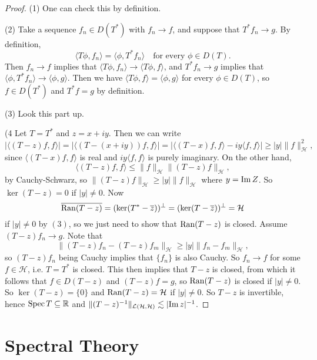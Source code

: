 \begin{proof}
  (1) One can check this by definition.

  (2) Take a sequence $f_n \in D(T^*)$ with
  $f_n \to f$, and suppose that $T^* f_n \to g$. By
  definition,
  \[
    \langle T \phi, f_n \rangle
    = \langle \phi, T^* f_n \rangle
    \quad \text{for every $\phi \in D(T)$}.
  \]
  Then $f_n \to f$ implies that
  $\langle T \phi, f_n \rangle \to \langle T \phi, f \rangle$,
  and $T^* f_n \to g$ implies that $\langle \phi, T^* f_n \rangle \to \langle \phi, g \rangle$.
  Then we have
  $\langle T \phi, f \rangle = \langle \phi, g \rangle$
  for every $\phi \in D(T)$, so
  $f \in D(T^*)$ and $T^* f = g$ by definition.

  (3) Look this part up.

  (4 Let $T = T^*$ and $z = x + iy$. Then we can write
  \[
    |\langle (T - z) f, f \rangle|
    = |\langle (T - (x + iy)) f, f \rangle|
    = |\langle (T - x) f, f \rangle
    - iy \langle f, f \rangle|
    \ge |y| \|f\|_{\mathcal{H}}^2,
  \]
  since $\langle (T - x) f, f \rangle$ is real and
  $iy \langle f, f \rangle$ is purely imaginary. On the
  other hand,
  \[
    \langle (T - z) f, f \rangle
    \le \|f\|_{\mathcal{H}} \|(T - z) f\|_{\mathcal{H}},
  \]
  by Cauchy-Schwarz, so $\|(T - z) f\|_{\mathcal{H}} \ge |y| \|f\|_{\mathcal{H}}$
  where $y = \operatorname{Im} Z$. So $\ker(T - z) = 0$ if $|y| \ne 0$.
  Now
  \[
    \overline{\operatorname{Ran}(T - z)} = (\ker (T^* - \overline{z}))^\perp
    = (\ker (T - \overline{z}))^\perp
    = \mathcal{H}
  \]
  if $|y| \ne 0$ by $(3)$, so we just need to show that
  $\operatorname{Ran}(T - z)$ is closed. Assume $(T - z) f_n \to g$.
  Note that
  \[
    \|(T - z) f_n - (T - z) f_m\|_{\mathcal{H}}
    \ge |y| \|f_n - f_m \|_{\mathcal{H}},
  \]
  so $(T - z) f_n$  being Cauchy implies that
  $\{f_n\}$ is also Cauchy. So $f_n \to f$ for some
  $f \in \mathcal{H}$, i.e. $T = T^*$ is closed.
  This then implies that $T - z$ is closed, from which it
  follows that $f \in D(T - z)$ and $(T - z)f = g$, so
  $\operatorname{Ran}(T - z)$ is closed if $|y| \ne 0$. So
  $\ker(T - z) = \{0\}$ and $\operatorname{Ran}(T - z) = \mathcal{H}$
  if $|y| \ne 0$. So $T - z$ is invertible, hence
  $\operatorname{Spec} T \subseteq \mathbb{R}$ and
  $\|(T - z)^{-1}\|_{\mathcal{L}(\mathcal{H}, \mathcal{H})} \lesssim |{\operatorname{Im} z}|^{-1}$.
\end{proof}

\section{Spectral Theory}

